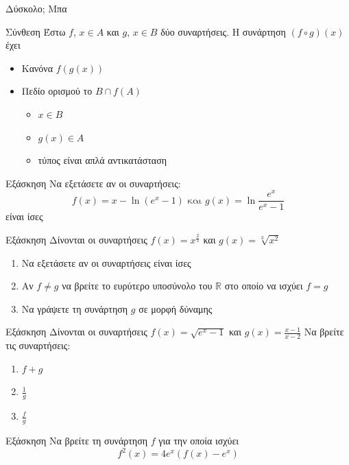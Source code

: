 \documentclass[greek]{beamer}
\begin{document}
\begin{frame}{Δύσκολο; Μπα}
 \begin{block}{Σύνθεση}
  Έστω $f$, $x\in Α$ και $g$, $x\in Β$ δύο συναρτήσεις. Η συνάρτηση $(f\circ g)(x)$ έχει
  \begin{itemize}
   \item Κανόνα $f(g(x))$
   \item Πεδίο ορισμού το $Β\cap f(Α)$
         \begin{itemize}
          \item<2-> $x\in Β$
          \item<3-> $g(x)\in Α$
          \item<4-> τύπος είναι απλά αντικατάσταση
         \end{itemize}
  \end{itemize}
 \end{block}
\end{frame}

\begin{frame}{Εξάσκηση}
 Να εξετάσετε αν οι συναρτήσεις:
 $$f(x)=x-\ln (e^x-1) \text{ και } g(x)=\ln\frac{e^x}{e^x-1}$$
 είναι ίσες
\end{frame}

\begin{frame}{Εξάσκηση}
 Δίνονται οι συναρτήσεις $f(x)=x^{\frac{2}{3}}$ και $g(x)=\sqrt[3]{x^2}$
 \begin{enumerate}
  \item<1-> Να εξετάσετε αν οι συναρτήσεις είναι ίσες
  \item<2-> Αν $f\ne g$ να βρείτε το ευρύτερο υποσύνολο του $\mathbb{R}$ στο οποίο να ισχύει $f=g$
  \item<3-> Να γράψετε τη συνάρτηση $g$ σε μορφή δύναμης
 \end{enumerate}
\end{frame}

\begin{frame}{Εξάσκηση}
 Δίνονται οι συναρτήσεις $f(x)=\sqrt{e^x-1}$ και $g(x)=\frac{x-1}{x-2}$
 Να βρείτε τις συναρτήσεις:
 \begin{enumerate}
  \item<1-> $f+g$
  \item<2-> $\frac{1}{g}$
  \item<3-> $\frac{f}{g}$
 \end{enumerate}
\end{frame}

\begin{frame}{Εξάσκηση}
 Να βρείτε τη συνάρτηση $f$ για την οποία ισχύει
 $$f^2(x)=4e^x\left(f(x)-e^x\right)$$
\end{frame}
\end{document}
